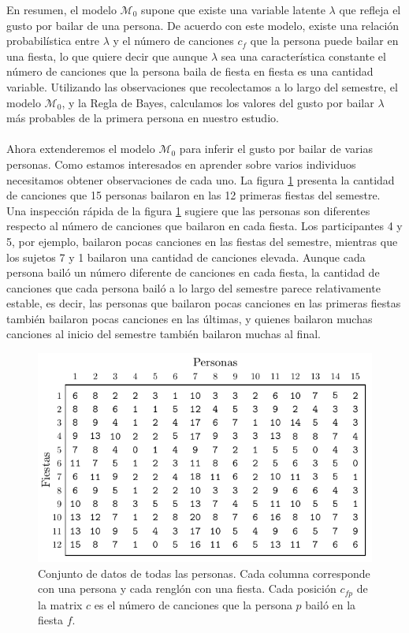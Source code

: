\documentclass{article}
\begin{document}
\indent En resumen, el modelo $\mathcal M_0$ supone que existe una variable latente $\lambda$ que refleja el gusto por bailar de una persona. De acuerdo con este modelo, existe una relación probabilística entre $\lambda$ y el número de canciones $c_f$ que la persona puede bailar en una fiesta, lo que quiere decir que aunque $\lambda$ sea una característica constante el número de canciones que la persona baila de fiesta en fiesta es una cantidad variable. Utilizando las observaciones que recolectamos a lo largo del semestre, el modelo $\mathcal M_0$, y la Regla de Bayes, calculamos los valores del gusto por bailar $\lambda$ más probables de la primera persona en nuestro estudio.\\\\
\indent Ahora extenderemos el modelo $\mathcal M_0$ para inferir el gusto por bailar de varias personas. Como estamos interesados en aprender sobre varios individuos necesitamos obtener observaciones de cada uno. La figura \ref{fig:data} presenta la cantidad de canciones que 15 personas bailaron en las 12 primeras fiestas del semestre.\\
\indent Una inspección rápida de la figura \ref{fig:data} sugiere que las personas son diferentes respecto al número de canciones que bailaron en cada fiesta. Los participantes 4 y 5, por ejemplo, bailaron pocas canciones en las fiestas del semestre, mientras que los sujetos 7 y 1 bailaron una cantidad de canciones elevada. Aunque cada persona bailó un número diferente de canciones en cada fiesta, la cantidad de canciones que cada persona bailó a lo largo del semestre parece relativamente estable, es decir, las personas que bailaron pocas canciones en las primeras fiestas también bailaron pocas canciones en las últimas, y quienes bailaron muchas canciones al inicio del semestre también bailaron muchas al final.\\

\begin{figure}[H]
\centering
\setlength\fboxsep{0pt}
\setlength\fboxrule{0.5pt}
\includegraphics[trim=0cm 0cm 0cm 0cm, clip=true, width=1\textwidth]	{data_1.pdf}
\caption{Conjunto de datos de todas las personas. Cada columna corresponde con una persona y cada renglón con una fiesta. Cada posición $c_{fp}$ de la matrix $c$ es el número de canciones que la persona $p$ bailó en la fiesta $f$.}
\label{fig:data}
\end{figure}
\end{document}
